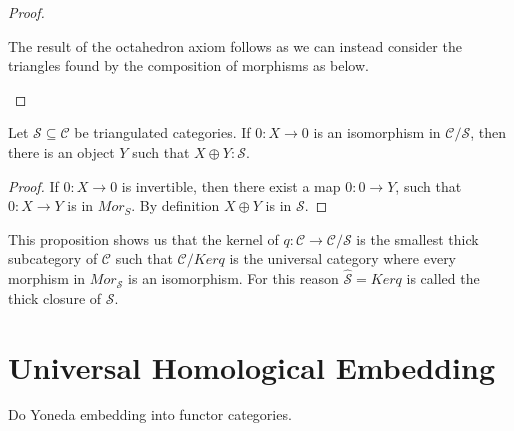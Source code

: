 \begin{proof}
\begin{center}
        \end{center}
        The result of the octahedron axiom follows as we can instead consider the triangles found by the composition of morphisms as below.
        \begin{center}
        \end{center}
    \end{proof}

    \begin{prop}
        Let $\mathcal{S}\subseteq\mathcal{C}$ be triangulated categories. If $0:X\rightarrow 0$ is an isomorphism in $\mathcal{C}/\mathcal{S}$, then there is an object $Y$ such that $X\oplus Y:\mathcal{S}$.
    \end{prop}

    \begin{proof}
        If $0:X\rightarrow 0$ is invertible, then there exist a map $0:0\rightarrow Y$, such that $0:X\rightarrow Y$ is in $Mor_S$. By definition $X\oplus Y$ is in $\mathcal{S}$.
    \end{proof}

    This proposition shows us that the kernel of $q:\mathcal{C}\rightarrow\mathcal{C}/\mathcal{S}$ is the smallest thick subcategory of $\mathcal{C}$ such that $\mathcal{C}/Kerq$ is the universal category where every morphism in $Mor_\mathcal{S}$ is an isomorphism. For this reason $\widehat{\mathcal{S}}=Kerq$ is called the thick closure of $\mathcal{S}$.

\section{Universal Homological Embedding}
    Do Yoneda embedding into functor categories.

